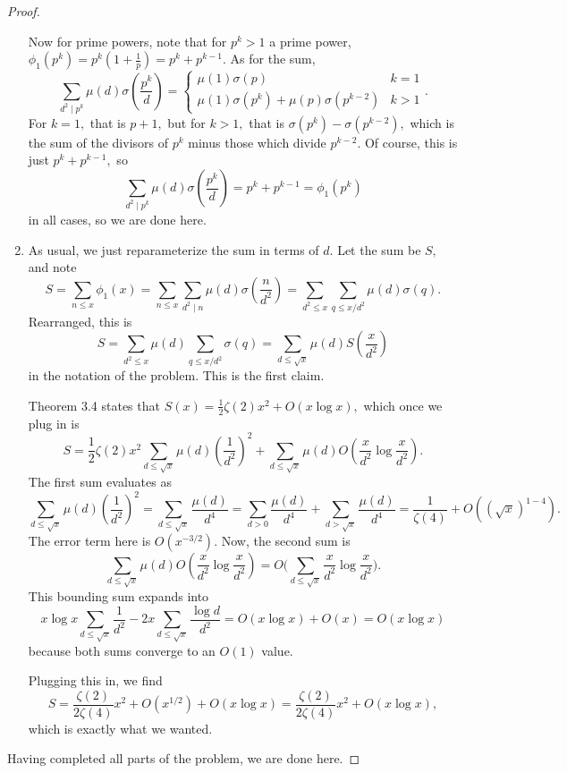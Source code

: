 \begin{proof}
\begin{enumerate}[label=(\alph*)]
    Now for prime powers, note that for $p^k>1$ a prime power, $\phi_1\left(p^k\right)=p^k\left(1+\frac1p\right)=p^k+p^{k-1}.$ As for the sum,
    \[\sum_{d^2\mid p^k}\mu(d)\sigma\left(\frac{p^k}d\right)=\begin{cases}\mu(1)\sigma(p)&k=1 \\ \mu(1)\sigma\left(p^k\right)+\mu(p)\sigma\left(p^{k-2}\right) & k>1\end{cases}.\]
    For $k=1,$ that is $p+1,$ but for $k>1,$ that is $\sigma\left(p^k\right)-\sigma\left(p^{k-2}\right),$ which is the sum of the divisors of $p^k$ minus those which divide $p^{k-2}.$ Of course, this is just $p^k+p^{k-1},$ so
    \[\sum_{d^2\mid p^k}\mu(d)\sigma\left(\frac{p^k}d\right)=p^k+p^{k-1}=\phi_1\left(p^k\right)\]
    in all cases, so we are done here.
    \item As usual, we just reparameterize the sum in terms of $d.$ Let the sum be $S,$ and note
    \[S=\sum_{n\le x}\phi_1(x)=\sum_{n\le x}\sum_{d^2\mid n}\mu(d)\sigma\left(\frac n{d^2}\right)=\sum_{d^2\le x}\sum_{q\le x/d^2}\mu(d)\sigma(q).\]
    Rearranged, this is
    \[S=\sum_{d^2\le x}\mu(d)\sum_{q\le x/d^2}\sigma(q)=\sum_{d\le\sqrt x}\mu(d)S\left(\frac x{d^2}\right)\]
    in the notation of the problem. This is the first claim.
    
    Theorem 3.4 states that $S(x)=\frac12\zeta(2)x^2+O(x\log x),$ which once we plug in is
    \[S=\frac12\zeta(2)x^2\sum_{d\le\sqrt x}\mu(d)\left(\frac1{d^2}\right)^2+\sum_{d\le\sqrt x}\mu(d)O\left(\frac x{d^2}\log\frac x{d^2}\right).\]
    The first sum evaluates as
    \[\sum_{d\le\sqrt x}\mu(d)\left(\frac1{d^2}\right)^2=\sum_{d\le\sqrt x}\frac{\mu(d)}{d^4}=\sum_{d>0}\frac{\mu(d)}{d^4}+\sum_{d>\sqrt x}\frac{\mu(d)}{d^4}=\frac1{\zeta(4)}+O\left(\left(\sqrt x\right)^{1-4}\right).\]
    The error term here is $O\left(x^{-3/2}\right).$ Now, the second sum is
    \[\sum_{d\le\sqrt x}\mu(d)O\left(\frac x{d^2}\log\frac x{d^2}\right)=O\Bigg(\sum_{d\le\sqrt x}\frac x{d^2}\log\frac x{d^2}\Bigg).\]
    This bounding sum expands into
    \[x\log x\sum_{d\le\sqrt x}\frac1{d^2}-2x\sum_{d\le\sqrt x}\frac{\log d}{d^2}=O(x\log x)+O(x)=O(x\log x)\]
    because both sums converge to an $O(1)$ value.
    
    Plugging this in, we find
    \[S=\frac{\zeta(2)}{2\zeta(4)}x^2+O\left(x^{1/2}\right)+O(x\log x)=\frac{\zeta(2)}{2\zeta(4)}x^2+O(x\log x),\]
    which is exactly what we wanted.
\end{enumerate}
Having completed all parts of the problem, we are done here.
\end{proof}

